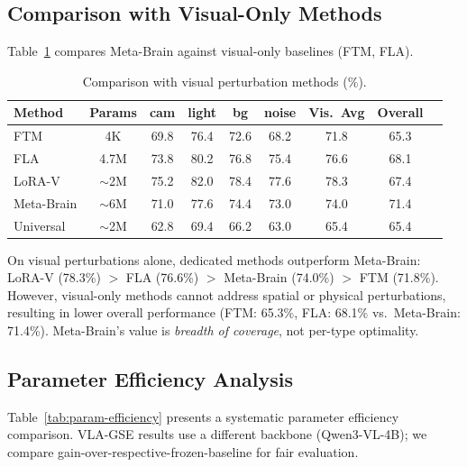 \documentclass[letterpaper]{article}
\begin{document}
\subsection{Comparison with Visual-Only Methods}

Table~\ref{tab:visual-methods} compares Meta-Brain against visual-only baselines (FTM, FLA).

\begin{table}[h]
\centering
\caption{Comparison with visual perturbation methods (\%).}
\label{tab:visual-methods}
\small
\begin{tabular}{lcccccccc}
\toprule
Method & Params & cam & light & bg & noise & Vis.\ Avg & Overall \\
\midrule
FTM        & 4K       & 69.8 & 76.4 & 72.6 & 68.2 & 71.8 & 65.3 \\
FLA        & 4.7M     & 73.8 & 80.2 & 76.8 & 75.4 & 76.6 & 68.1 \\
LoRA-V     & ${\sim}$2M    & 75.2 & 82.0 & 78.4 & 77.6 & 78.3 & 67.4 \\
Meta-Brain & ${\sim}$6M    & 71.0 & 77.6 & 74.4 & 73.0 & 74.0 & 71.4 \\
Universal  & ${\sim}$2M    & 62.8 & 69.4 & 66.2 & 63.0 & 65.4 & 65.4 \\
\bottomrule
\end{tabular}
\end{table}

On visual perturbations alone, dedicated methods outperform Meta-Brain: LoRA-V (78.3\%) $>$ FLA (76.6\%) $>$ Meta-Brain (74.0\%) $>$ FTM (71.8\%).
However, visual-only methods cannot address spatial or physical perturbations, resulting in lower overall performance (FTM: 65.3\%, FLA: 68.1\% vs.\ Meta-Brain: 71.4\%).
Meta-Brain's value is \emph{breadth of coverage}, not per-type optimality.

\subsection{Parameter Efficiency Analysis}

Table~\ref{tab:param-efficiency} presents a systematic parameter efficiency comparison.
VLA-GSE results use a different backbone (Qwen3-VL-4B); we compare gain-over-respective-frozen-baseline for fair evaluation.
\end{document}
